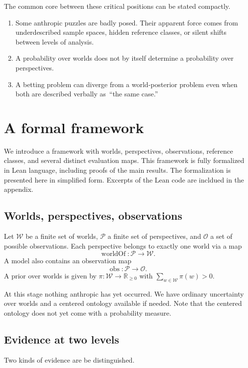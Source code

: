 \documentclass[11pt]{article}
\newcommand{\1}{\mathbf{1}}
\newcommand{\W}{\mathcal{W}}
\newcommand{\Persp}{\mathcal{P}}
\newcommand{\Obs}{\mathcal{O}}
\begin{document}
The common core between these critical positions can be stated compactly.

\begin{enumerate}[label=(\roman*)]
  \item Some anthropic puzzles are badly posed. Their apparent force comes from underdescribed sample spaces, hidden reference classes, or silent shifts between levels of analysis.
  \item A probability over worlds does not by itself determine a probability over perspectives.
  \item A betting problem can diverge from a world-posterior problem even when both are described verbally as \,``the same case.''
\end{enumerate}


\section{A formal framework}
We introduce a framework with worlds, perspectives, observations, reference classes, and several distinct evaluation maps.
This framework is fully formalized in Lean language, including proofs of the main results. The formalization is presented here in simplified form. Excerpts of the Lean code are incldued in the appendix.

\subsection{Worlds, perspectives, observations}

Let $\W$ be a finite set of worlds, $\Persp$ a finite set of perspectives, and $\Obs$ a set of possible observations. Each perspective belongs to exactly one world via a map
\[
\operatorname{worldOf} : \Persp \to \W.
\]
A model also contains an observation map
\[
\operatorname{obs} : \Persp \to \Obs.
\]
A prior over worlds is given by $\pi : \W \to \mathbb{R}_{\ge 0}$ with $\sum_{w \in \W} \pi(w) > 0$.

At this stage nothing anthropic has yet occurred. We have ordinary uncertainty over worlds and a centered ontology available if needed.
Note that the centered ontology does not yet come with a probability measure.

\subsection{Evidence at two levels}

Two kinds of evidence are be distinguished.
\end{document}
